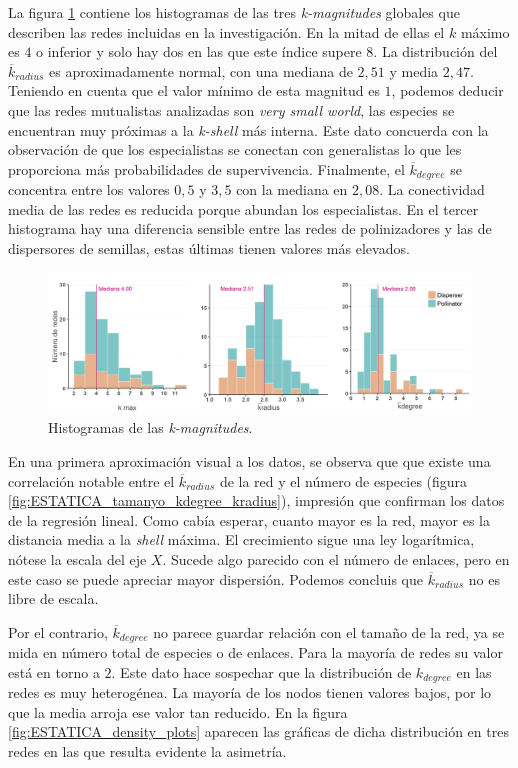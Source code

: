 La figura \ref{fig:ESTATICA_hist_kmagnitudes} contiene los histogramas de las tres \textit{k-magnitudes} globales que describen las redes incluidas en la investigación. En la mitad de ellas el $k$ máximo es $4$ o inferior y solo hay dos en las que este índice supere $8$. La distribución del $\overline{k}_{radius}$ es aproximadamente normal, con una mediana de $2,51$ y media $2,47$. Teniendo en cuenta que el valor mínimo de esta magnitud es $1$, podemos deducir que las redes mutualistas analizadas son \textit{very small world}, las especies se encuentran muy próximas a la \textit{k-shell} más interna. Este dato concuerda con la observación de que los especialistas se conectan con generalistas lo que les proporciona más probabilidades de supervivencia. Finalmente, el $\overline{k}_{degree}$ se
concentra entre los valores $0,5$ y $3,5$ con la mediana en $2,08$. La conectividad media de las redes es reducida
porque abundan los especialistas. En el tercer histograma hay una diferencia sensible entre las redes de polinizadores
y las de dispersores de semillas, estas últimas tienen valores más elevados.

\begin{figure}[h!]
\centering
\includegraphics[scale=0.5]{Figures/ESTATICA_hist_kmagnitudes.png}
\caption{Histogramas de las \textit{k-magnitudes}.}
\label{fig:ESTATICA_hist_kmagnitudes}
\end{figure}

En una primera aproximación visual a los datos, se observa que que existe una correlación notable entre el $\overline{k}_{radius}$ de la red y el número de especies (figura \ref{fig:ESTATICA_tamanyo_kdegree_kradius}), impresión que confirman los datos de la regresión lineal. Como cabía esperar, cuanto mayor es la red, mayor es la distancia media a la \textit{shell} máxima. El crecimiento sigue una ley logarítmica, nótese la escala del eje $X$. Sucede algo parecido con el número de enlaces, pero en este caso se puede apreciar mayor dispersión. Podemos concluis que $\overline{k}_{radius}$ no es libre de escala.

Por el contrario, $\overline{k}_{degree}$ no parece guardar relación con el tamaño de la red, ya se mida en número total de especies o de enlaces. Para la mayoría de redes su valor está en torno a $2$. Este dato hace sospechar que la distribución de ${k}_{degree}$ en las redes es muy heterogénea. La mayoría de los nodos tienen valores bajos, por lo que la media arroja ese valor tan reducido. En la figura \ref{fig:ESTATICA_density_plots} aparecen las gráficas de dicha distribución en tres redes en las que resulta evidente la asimetría. 

